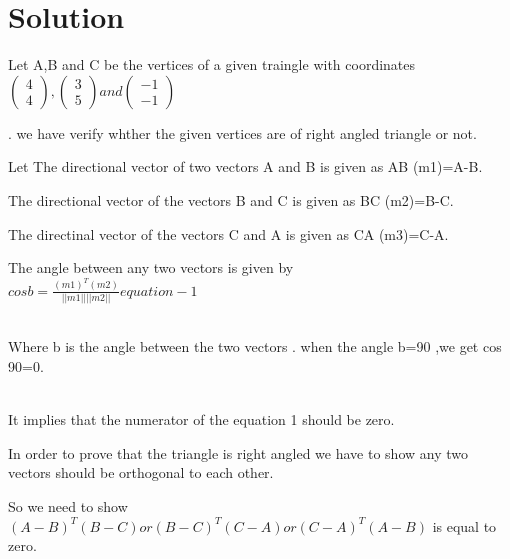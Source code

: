 \documentclass[journal,12pt,twocolumn]{IEEEtran}
\begin{document}
\section{Solution}
\raggedright 
\vspace{0.25cm}
Let A,B and C be the vertices of a given traingle with coordinates $\begin{pmatrix}
4 \\
4
\end{pmatrix}
, \begin{pmatrix}
3 \\
5
\end{pmatrix}
 and \begin{pmatrix}
-1 \\
-1
\end{pmatrix} $
\raggedright
. we have verify whther the given vertices are of right angled triangle or not.\\
\begin{center}
\raggedright
Let The directional vector of two vectors A and B is given as AB (m1)=A-B.
\end{center}
\vspace{0.25cm}
\begin{center}
The directional vector of the vectors B and C is given as BC (m2)=B-C.
\end{center}
\vspace{0.25cm}
\begin{center}
The directinal vector of the vectors C and A is given as CA (m3)=C-A.
\end{center}
\vspace{0.25cm}
The angle between any two vectors is given by
\boldmath{0.2cm}
\\ $ cos b =\frac{(m1)^T(m2)}{||m1|| ||m2||}  equation-1$
\unboldmath
\vspace{0.5cm}\raggedright\\
Where b is the angle between the two vectors .
when the angle b=90 ,we get cos 90=0.
\vspace{0.5cm}\raggedright\\
It implies that the numerator of the equation 1 should be zero.

\vspace{0.25cm}
 In order to prove that the triangle is right angled we have to show any two vectors should be orthogonal to each other.
 
\vspace{0.25cm}\raggedright
So we need to show $(A-B)^T(B-C) or (B-C)^T(C-A) or (C-A)^T(A-B) $ is equal to zero.
\end{document}
